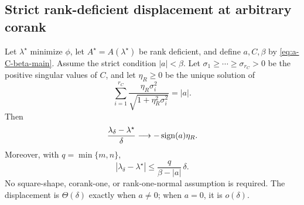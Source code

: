 \subsection{Strict rank-deficient displacement at arbitrary corank}

\begin{theorem}
\label{thm:rate-strict-general}
Let \(\lambda^\star\) minimize \(\phi\), let
\(A^\star=A(\lambda^\star)\) be rank deficient, and define \(a,C,\beta\)
by \eqref{eq:a-C-beta-main}.  Assume the strict condition
\(|a|<\beta\).  Let
\(\sigma_1\ge\cdots\ge\sigma_{r_C}>0\) be the positive singular values
of \(C\), and let \(\eta_R\ge0\) be the unique solution of
\begin{equation}
 \sum_{i=1}^{r_C}
 \frac{\eta_R\sigma_i^2}{\sqrt{1+\eta_R^2\sigma_i^2}}=|a|.
 \label{eq:eta-strict-rate-main}
\end{equation}
Then
\begin{equation}
 \frac{\lambda_\delta-\lambda^\star}{\delta}
 \longrightarrow-\operatorname{sign}(a)\eta_R.
 \label{eq:strict-general-rate-main}
\end{equation}
Moreover, with \(q=\min\{m,n\}\),
\begin{equation}
 |\lambda_\delta-\lambda^\star|
 \le \frac{q}{\beta-|a|}\,\delta.
 \label{eq:strict-general-bound-main}
\end{equation}
No square-shape, corank-one, or rank-one-normal assumption is required.
The displacement is \(\Theta(\delta)\) exactly when \(a\ne0\); when
\(a=0\), it is \(o(\delta)\).
\end{theorem}

